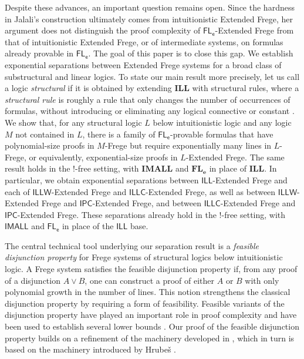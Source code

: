 \documentclass[12pt,a4paper]{article}
\theoremstyle{plain}
\theoremstyle{definition}
\begin{document}
Despite these advances, an important question remains open. Since the hardness in Jalali's construction ultimately comes from intuitionistic Extended Frege, her argument does not distinguish the proof complexity of $\mathsf{FL_e}$-Extended Frege from that of intuitionistic Extended Frege, or of intermediate systems, on formulas already provable in $\mathsf{FL_e}$.
The goal of this paper is to close this gap. We establish exponential separations between Extended Frege systems for a broad class of substructural and linear logics. 
To state our main result more precisely, let us call a logic \emph{structural} if it is obtained by extending $\mathbf{ILL}$ with structural rules, where a \emph{structural rule} is roughly a rule that only changes the number of occurrences of formulas, without introducing or eliminating any logical connective or constant \cite{ciabattoni2008axioms,ciabattoni2012algebraic}. We show that, for any structural logic $L$ below intuitionistic logic and any logic $M$ not contained in $L$, there is a family of $\mathsf{FL_e}$-provable formulas that have polynomial-size proofs in $M$-Frege but require exponentially many lines in $L$-Frege, or equivalently, exponential-size proofs in $L$-Extended Frege. The same result holds in the $!$-free setting, with $\mathbf{IMALL}$ and $\mathbf{FL_e}$ in place of $\mathbf{ILL}$.
In particular, we obtain exponential separations between $\mathsf{ILL}$-Extended Frege and each of $\mathsf{ILLW}$-Extended Frege and $\mathsf{ILLC}$-Extended Frege, as well as between $\mathsf{ILLW}$-Extended Frege and $\mathsf{IPC}$-Extended Frege, and between $\mathsf{ILLC}$-Extended Frege and $\mathsf{IPC}$-Extended Frege. These separations already hold in the $!$-free setting, with $\mathsf{IMALL}$ and $\mathsf{FL_e}$ in place of the $\mathsf{ILL}$ base.

The central technical tool underlying our separation result is a \emph{feasible disjunction property} for Frege systems of structural logics below intuitionistic logic. A Frege system satisfies the feasible disjunction property if, from any proof of a disjunction $A \vee B$, one can construct a proof of either $A$ or $B$ with only polynomial growth in the number of lines. This notion strengthens the classical disjunction property by requiring a form of feasibility. Feasible variants of the disjunction property have played an important role in proof complexity and have been used to establish several lower bounds \cite{Pudlak,PudlakBuss,BussMints}. Our proof of the feasible disjunction property builds on a refinement of the machinery developed in \cite{tabatabai2025}, which in turn is based on the machinery introduced by Hrubeš \cite{Hrubes}.
\end{document}
